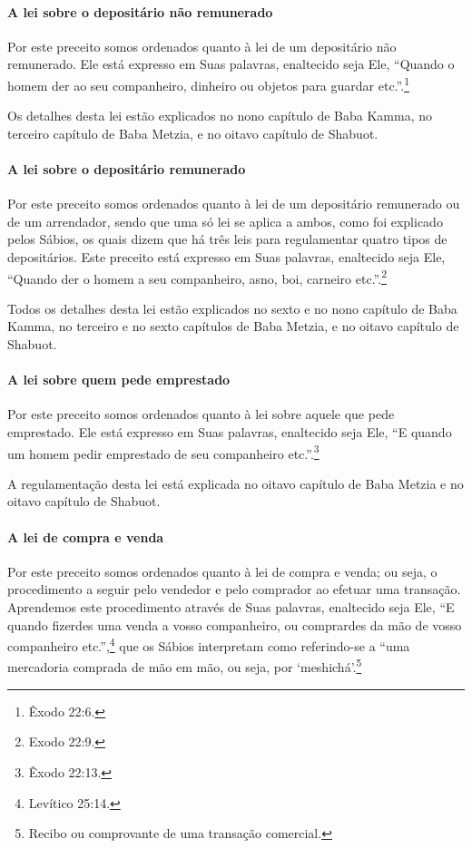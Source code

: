 \paragraph{A lei sobre o depositário não remunerado}

Por este preceito somos ordenados quanto à lei de um depositário não
remunerado. Ele está expresso em Suas palavras, enaltecido seja Ele,
``Quando o homem der ao seu companheiro, dinheiro ou objetos para
guardar etc.''.\footnote{Êxodo 22:6.}

Os detalhes desta lei estão explicados no nono capítulo de Baba Kamma,
no terceiro capítulo de Baba Metzia, e no oitavo capítulo de Shabuot.

\paragraph{A lei sobre o depositário remunerado}

Por este preceito somos ordenados quanto à lei de um depositário
remunerado ou de um arrendador, sendo que uma só lei se aplica a ambos,
como foi explicado pelos Sábios, os quais dizem que há três leis para
regulamentar quatro tipos de depositários. Este preceito está expresso
em Suas palavras, enaltecido seja Ele, ``Quando der o homem a seu
companheiro, asno, boi, carneiro etc.''.\footnote{Exodo 22:9.}

Todos os detalhes desta lei estão explicados no sexto e no nono
capítulo de Baba Kamma, no terceiro e no sexto capítulos de Baba
Metzia, e no oitavo capítulo de Shabuot.

\paragraph{A lei sobre quem pede emprestado}

Por este preceito somos ordenados quanto à lei sobre aquele que pede
emprestado. Ele está expresso em Suas palavras, enaltecido seja Ele, ``E
quando um homem pedir emprestado de seu companheiro etc.''.\footnote{Êxodo
22:13.}

A regulamentação desta lei está explicada no oitavo capítulo de Baba
Metzia e no oitavo capítulo de Shabuot.

\paragraph{A lei de compra e venda}

Por este preceito somos ordenados quanto à lei de compra e venda; ou
seja, o procedimento a seguir pelo vendedor e pelo comprador ao efetuar
uma transação. Aprendemos este procedimento através de Suas palavras,
enaltecido seja Ele, ``E quando fizerdes uma venda a vosso companheiro,
ou comprardes da mão de vosso companheiro etc.'',\footnote{Levítico 25:14.} que
os Sábios interpretam como referindo-se a ``uma mercadoria comprada de mão em mão,
ou seja, por `meshichá'.\footnote{Recibo ou comprovante de uma transação comercial.}

